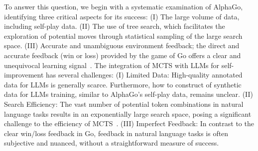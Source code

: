 
To answer this question, we begin with a systematic examination of AlphaGo, identifying three critical aspects for its success: (\RN{1}) The large volume of data, including self-play data. (\RN{2}) The use of tree search, which facilitates the exploration of potential moves through statistical sampling of the large search space. (\RN{3}) Accurate and unambiguous environment feedback; the direct and accurate feedback (win or loss) provided by the game of Go offers a clear and unequivocal learning signal~\citep{silver2017mastering}. The integration of MCTS with LLMs for self-improvement has several challenges: (\RN{1}) Limited Data: High-quality annotated data for LLMs is generally scarce. Furthermore, how to construct of synthetic data for LLMs training, similar to AlphaGo's self-play data, remains unclear. (\RN{2}) Search Efficiency: The vast number of potential token combinations in natural language tasks results in an exponentially large search space, posing a significant challenge to the efficiency of MCTS~\citep{Ramamurthy2022IsRL}. (\RN{3}) Imperfect Feedback: In contrast to the clear win/loss feedback in Go, feedback in natural language tasks is often subjective and nuanced, without a straightforward measure of success.

